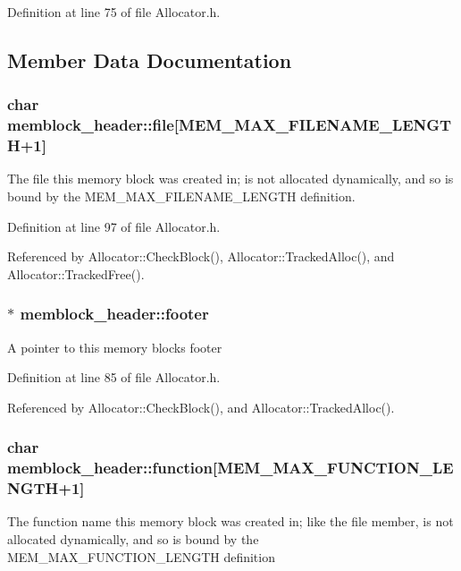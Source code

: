 Definition at line 75 of file Allocator.\-h.



\subsection{Member Data Documentation}
\subsubsection[{file}]{\setlength{\rightskip}{0pt plus 5cm}char memblock\-\_\-header\-::file\mbox{[}{\bf M\-E\-M\-\_\-\-M\-A\-X\-\_\-\-F\-I\-L\-E\-N\-A\-M\-E\-\_\-\-L\-E\-N\-G\-T\-H}+1\mbox{]}}\label{structmemblock__header_a97093dcb31daa58a36e471701b63d0d3}
The file this memory block was created in; is not allocated dynamically, and so is bound by the M\-E\-M\-\_\-\-M\-A\-X\-\_\-\-F\-I\-L\-E\-N\-A\-M\-E\-\_\-\-L\-E\-N\-G\-T\-H definition. 

Definition at line 97 of file Allocator.\-h.



Referenced by Allocator\-::\-Check\-Block(), Allocator\-::\-Tracked\-Alloc(), and Allocator\-::\-Tracked\-Free().

\subsubsection[{footer}]{$\ast$ memblock\-\_\-header\-::footer}\label{structmemblock__header_ab9999ece91b34ae2742865b27791b374}
A pointer to this memory blocks footer 

Definition at line 85 of file Allocator.\-h.



Referenced by Allocator\-::\-Check\-Block(), and Allocator\-::\-Tracked\-Alloc().

\subsubsection[{function}]{\setlength{\rightskip}{0pt plus 5cm}char memblock\-\_\-header\-::function\mbox{[}{\bf M\-E\-M\-\_\-\-M\-A\-X\-\_\-\-F\-U\-N\-C\-T\-I\-O\-N\-\_\-\-L\-E\-N\-G\-T\-H}+1\mbox{]}}\label{structmemblock__header_ab3a09c5ab1300cb51e93ff910431c40f}
The function name this memory block was created in; like the file member, is not allocated dynamically, and so is bound by the M\-E\-M\-\_\-\-M\-A\-X\-\_\-\-F\-U\-N\-C\-T\-I\-O\-N\-\_\-\-L\-E\-N\-G\-T\-H definition 

